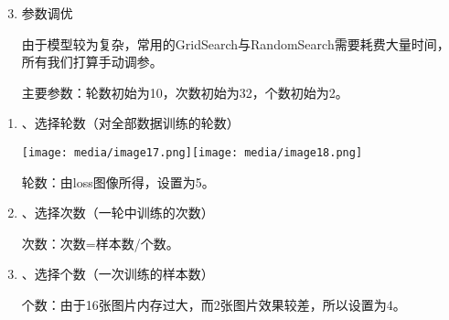 \begin{enumerate}
\setcounter{enumi}{2}
\item
  参数调优

  由于模型较为复杂，常用的GridSearch与RandomSearch需要耗费大量时间，所有我们打算手动调参。

  主要参数：轮数初始为10，次数初始为32，个数初始为2。
\end{enumerate}

\begin{enumerate}
\def\labelenumi{\arabic{enumi}.}
\item
  、选择轮数（对全部数据训练的轮数）

  \texttt{[image: media/image17.png]}\texttt{[image: media/image18.png]}

  轮数：由loss图像所得，设置为5。
\item
  、选择次数（一轮中训练的次数）

  次数：次数=样本数/个数。
\item
  、选择个数（一次训练的样本数）

  个数：由于16张图片内存过大，而2张图片效果较差，所以设置为4。
\end{enumerate}
